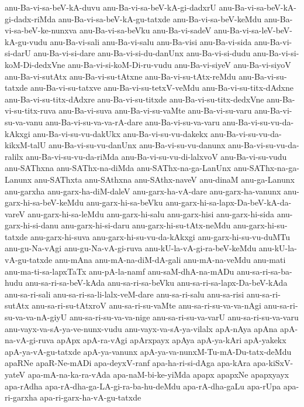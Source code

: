 {anu-Ba-vi-sa-beV-kA-duvu
anu-Ba-vi-sa-beV-kA-gi-dadxrU
anu-Ba-vi-sa-beV-kA-gi-dadx-riMda
anu-Ba-vi-sa-beV-kA-gu-tatxde
anu-Ba-vi-sa-beV-keMdu
anu-Ba-vi-sa-beV-ke-nunxva
anu-Ba-vi-sa-beVku
anu-Ba-vi-sadeV
anu-Ba-vi-sa-leV-beV-kA-gu-vudu
anu-Ba-vi-sali
anu-Ba-vi-salu
anu-Ba-visi
anu-Ba-vi-sida
anu-Ba-vi-si-darU
anu-Ba-vi-si-dare
anu-Ba-vi-si-du-danUnx
anu-Ba-vi-si-dudu
anu-Ba-vi-si-koM-Di-dedxVne
anu-Ba-vi-si-koM-Di-ru-vudu
anu-Ba-vi-siyeV
anu-Ba-vi-siyoV
anu-Ba-vi-sutAtx
anu-Ba-vi-su-tAtxne
anu-Ba-vi-su-tAtx-reMdu
anu-Ba-vi-su-tatxde
anu-Ba-vi-su-tatxve
anu-Ba-vi-su-tetxV-veMdu
anu-Ba-vi-su-titx-dAdxne
anu-Ba-vi-su-titx-dAdxre
anu-Ba-vi-su-titxde
anu-Ba-vi-su-titx-dedxVne
anu-Ba-vi-su-titx-ruva
anu-Ba-vi-suva
anu-Ba-vi-su-vaMte
anu-Ba-vi-su-varu
anu-Ba-vi-su-va-vanu
anu-Ba-vi-su-va-va-rA-dare
anu-Ba-vi-su-va-varu
anu-Ba-vi-su-vu-da-kAkxgi
anu-Ba-vi-su-vu-dakUkx
anu-Ba-vi-su-vu-dakekx
anu-Ba-vi-su-vu-da-kikxM-talU
anu-Ba-vi-su-vu-danUnx
anu-Ba-vi-su-vu-danunx
anu-Ba-vi-su-vu-da-ralilx
anu-Ba-vi-su-vu-da-riMda
anu-Ba-vi-su-vu-di-lalxvoV
anu-Ba-vi-su-vudu
anu-SAThxna
anu-SAThx-na-diMda
anu-SAThx-na-ga-LanUnx
anu-SAThx-na-ga-Lanunx
anu-SAThxta
anu-SAthxna
anu-SAthx-naveV
anu-dinaM
anu-ga-Lanunx
anu-garxha
anu-garx-ha-diM-daleV
anu-garx-ha-vA-dare
anu-garx-ha-vanunx
anu-garx-hi-sa-beV-keMdu
anu-garx-hi-sa-beVku
anu-garx-hi-sa-lapx-Da-beV-kA-da-vareV
anu-garx-hi-sa-leMdu
anu-garx-hi-salu
anu-garx-hisi
anu-garx-hi-sida
anu-garx-hi-si-danu
anu-garx-hi-si-daru
anu-garx-hi-su-tAtx-neMdu
anu-garx-hi-su-tatxde
anu-garx-hi-suva
anu-garx-hi-su-vu-da-kAkxgi
anu-garx-hi-su-vu-duMTu
anu-gu-Na-vAgi
anu-gu-Na-vA-gi-ruva
anu-kU-la-vA-gi-ra-beV-keMdu
anu-kU-la-vA-gu-tatxde
anu-mAna
anu-mA-na-diM-dA-gali
anu-mA-na-veMdu
anu-mati
anu-ma-ti-sa-lapxTaTx
anu-pA-la-namf
anu-saM-dhA-na-mADu
anu-sa-ri-sa-ba-hudu
anu-sa-ri-sa-beV-kAda
anu-sa-ri-sa-beVku
anu-sa-ri-sa-lapx-Da-beV-kAda
anu-sa-ri-sali
anu-sa-ri-sa-li-lalx-veM-dare
anu-sa-ri-salu
anu-sa-risi
anu-sa-ri-sutAtx
anu-sa-ri-su-tAtxroV
anu-sa-ri-su-vaMte
anu-sa-ri-su-va-va-nAgi
anu-sa-ri-su-va-va-nA-giyU
anu-sa-ri-su-va-va-nige
anu-sa-ri-su-va-varU
anu-sa-ri-su-va-varu
anu-vayx-va-sA-ya-ve-nunx-vudu
anu-vayx-va-sA-ya-vilalx
apA-nAya
apAna
apA-na-vA-gi-ruva
apApx
apA-ra-vAgi
apArxpayx
apAya
apA-ya-kAri
apA-yakekx
apA-ya-vA-gu-tatxde
apA-ya-vanunx
apA-ya-va-nunxM-Tu-mA-Du-tatx-deMdu
apaRNe
apaR-Ne-mADi
apa-deyxV-ranf
apa-ha-ri-si-dAga
apa-kAra
apa-kiSxV-yateV
apa-mA-na-ka-ra-vAda
apa-naM-bi-ke-yiMda
apapx
apapxNe
apapxyayx
apa-rAdha
apa-rA-dha-ga-LA-gi-ra-ba-hu-deMdu
apa-rA-dha-gaLu
apa-rUpa
apa-ri-garxha
apa-ri-garx-ha-vA-gu-tatxde
}
